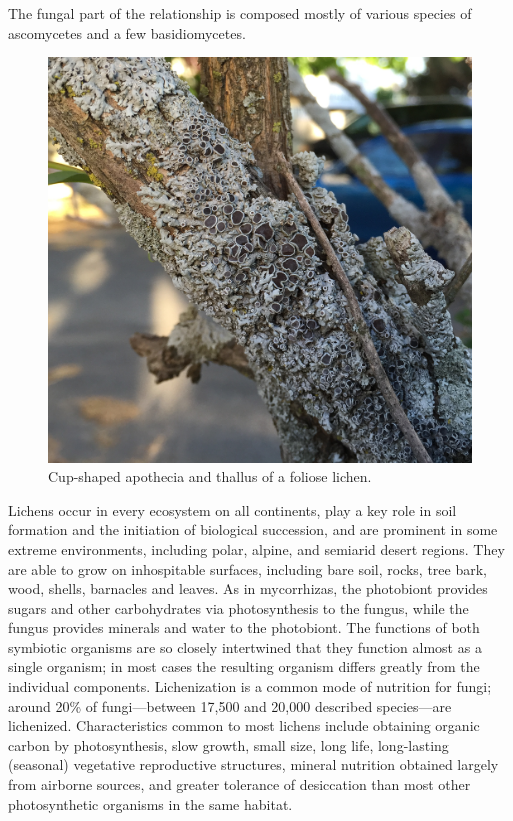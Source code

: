 The fungal part of the relationship is composed mostly of various species of ascomycetes and a few basidiomycetes.



\begin{figure}

{\centering \includegraphics[width=0.7\linewidth]{./figures/fungi/lichen_apothecium} 

}

\caption{Cup-shaped apothecia and thallus of a foliose lichen.}\label{fig:lichenapothecium}
\end{figure}

Lichens occur in every ecosystem on all continents, play a key role in soil formation and the initiation of biological succession, and are prominent in some extreme environments, including polar, alpine, and semiarid desert regions. They are able to grow on inhospitable surfaces, including bare soil, rocks, tree bark, wood, shells, barnacles and leaves. As in mycorrhizas, the photobiont provides sugars and other carbohydrates via photosynthesis to the fungus, while the fungus provides minerals and water to the photobiont. The functions of both symbiotic organisms are so closely intertwined that they function almost as a single organism; in most cases the resulting organism differs greatly from the individual components. Lichenization is a common mode of nutrition for fungi; around 20\% of fungi---between 17,500 and 20,000 described species---are lichenized. Characteristics common to most lichens include obtaining organic carbon by photosynthesis, slow growth, small size, long life, long-lasting (seasonal) vegetative reproductive structures, mineral nutrition obtained largely from airborne sources, and greater tolerance of desiccation than most other photosynthetic organisms in the same habitat.

